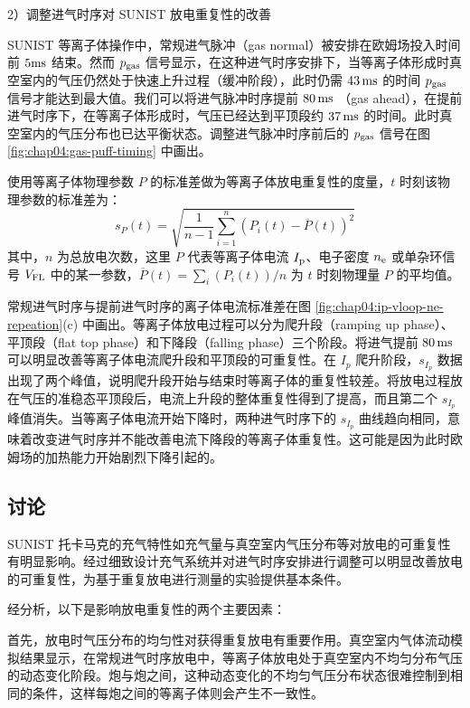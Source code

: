 2）调整进气时序对 SUNIST 放电重复性的改善

SUNIST 等离子体操作中，常规进气脉冲（gas normal）被安排在欧姆场投入时间前 $5 {\rm ms}$ 结束。然而 $p_{\rm gas}$ 信号显示，在这种进气时序安排下，当等离子体形成时真空室内的气压仍然处于快速上升过程（缓冲阶段），此时仍需 $43\,{\rm ms}$ 的时间 $p_{\rm gas}$ 信号才能达到最大值。我们可以将进气脉冲时序提前 $80\,{\rm ms}$ （gas ahead），在提前进气时序下，在等离子体形成时，气压已经达到平顶段约 $37\,{\rm ms}$ 的时间。此时真空室内的气压分布也已达平衡状态。调整进气脉冲时序前后的 $p_{\rm gas}$ 信号在图 \ref{fig:chap04:gas-puff-timing} 中画出。

使用等离子体物理参数 $P$ 的标准差做为等离子体放电重复性的度量，$t$ 时刻该物理参数的标准差为：
\begin{equation}
  s_{P}(t)=\sqrt{\frac{1}{n-1}\sum_{i=1}^{n}\left(P_i(t)-\overline{P}(t)\right)^2}
  \label{eq:chap04:standard-deviation-of-parameter}
\end{equation}
其中，$n$ 为总放电次数，这里 $P$ 代表等离子体电流 $I_{\rm p}$、电子密度 $n_{\rm e}$ 或单杂环信号 $V_{\rm FL}$ 中的某一参数，$\overline{P}(t)=\sum_i\left(P_i(t)\right)/n$ 为 $t$ 时刻物理量 $P$ 的平均值。

常规进气时序与提前进气时序的离子体电流标准差在图 \ref{fig:chap04:ip-vloop-ne-repeation}(c) 中画出。等离子体放电过程可以分为爬升段（ramping up phase）、平顶段（flat top phase）和下降段（falling phase）三个阶段。将进气提前 $80\,{\rm ms}$ 可以明显改善等离子体电流爬升段和平顶段的可重复性。在 $I_p$ 爬升阶段，$s_{I_p}$ 数据出现了两个峰值，说明爬升段开始与结束时等离子体的重复性较差。将放电过程放在气压的准稳态平顶段后，电流上升段的整体重复性得到了提高，而且第二个 $s_{I_p}$ 峰值消失。当等离子体电流开始下降时，两种进气时序下的 $s_{I_p}$ 曲线趋向相同，意味着改变进气时序并不能改善电流下降段的等离子体重复性。这可能是因为此时欧姆场的加热能力开始剧烈下降引起的。



\subsection{讨论}

SUNIST 托卡马克的充气特性\pozhehao 如充气量与真空室内气压分布等\pozhehao 对放电的可重复性有明显影响。经过细致设计充气系统并对进气时序安排进行调整可以明显改善放电的可重复性，为基于重复放电进行测量的实验提供基本条件。

经分析，以下是影响放电重复性的两个主要因素：

首先，放电时气压分布的均匀性对获得重复放电有重要作用。真空室内气体流动模拟结果显示，在常规进气时序放电中，等离子体放电处于真空室内不均匀分布气压的动态变化阶段。炮与炮之间，这种动态变化的不均匀气压分布状态很难控制到相同的条件，这样每炮之间的等离子体则会产生不一致性。

